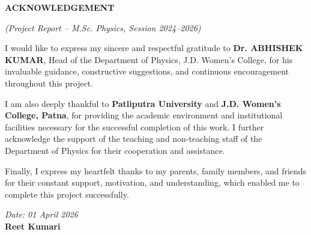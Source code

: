 \documentclass[12pt]{report}
\newcommand{\AcknowledgementXShift}{0pt}
\newcommand{\AcknowledgementYShift}{0pt}
\begin{document}
\begin{titlepage}
    \pagecolor{white}
    \color{black}
    \thispagestyle{empty}
    \centering

    \hspace*{\AcknowledgementXShift}
    \vspace*{\AcknowledgementYShift}
    \vspace*{0.55cm}
    {\color{frontmatterolive}\bfseries\fontsize{22}{25}\selectfont ACKNOWLEDGEMENT\par}
    \vspace{.10cm}
    {\itshape\fontsize{11}{13}\selectfont (Project Report -- M.Sc. Physics, Session 2024--2026)\par}
    \vspace{.9cm}

    \begin{minipage}{0.72\textwidth}
    \fontsize{14}{17}\selectfont
    \justifying
    I would like to express my sincere and respectful gratitude to \textbf{Dr. ABHISHEK KUMAR}, Head of the Department of Physics, J.D. Women's College, for his invaluable guidance, constructive suggestions, and continuous encouragement throughout this project.

    I am also deeply thankful to \textbf{Patliputra University} and \textbf{J.D. Women's College, Patna}, for providing the academic environment and institutional facilities necessary for the successful completion of this work. I further acknowledge the support of the teaching and non-teaching staff of the Department of Physics for their cooperation and assistance.

    Finally, I express my heartfelt thanks to my parents, family members, and friends for their constant support, motivation, and understanding, which enabled me to complete this project successfully.
    \end{minipage}

    \vspace{2.25cm}
    \begin{minipage}{0.72\textwidth}
    \fontsize{13}{16}\selectfont
    \raggedleft
    \textit{Date: 01 April 2026}\\
    \textbf{Reet Kumari}
    \end{minipage}


    \vfill
    {\fontsize{12}{14}}
\end{titlepage}
\newpage
\end{document}
